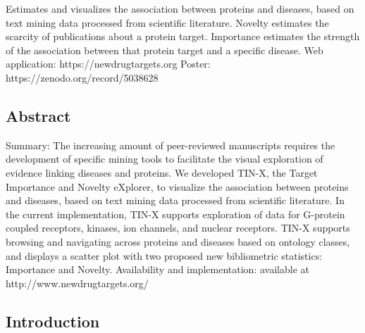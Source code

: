 Estimates and visualizes the association between proteins and diseases, based on text mining data processed from scientific literature.  Novelty estimates the scarcity of publications about a protein target. Importance estimates the strength of the association between that protein target and a specific disease.
Web application: https://newdrugtargets.org
Poster: https://zenodo.org/record/5038628

\subsection{Abstract}

Summary: The increasing amount of peer-reviewed manuscripts requires the development of specific mining tools to facilitate the visual exploration of evidence linking diseases and proteins. We developed TIN-X, the Target Importance and Novelty eXplorer, to visualize the association between proteins and diseases, based on text mining data processed from scientific literature. In the current implementation, TIN-X supports exploration of data for G-protein coupled receptors, kinases, ion channels, and nuclear receptors. TIN-X supports browsing and navigating across proteins and diseases based on ontology classes, and displays a scatter plot with two proposed new bibliometric statistics: Importance and Novelty. 
Availability  and implementation:  available at http://www.newdrugtargets.org/

\subsection{Introduction}

